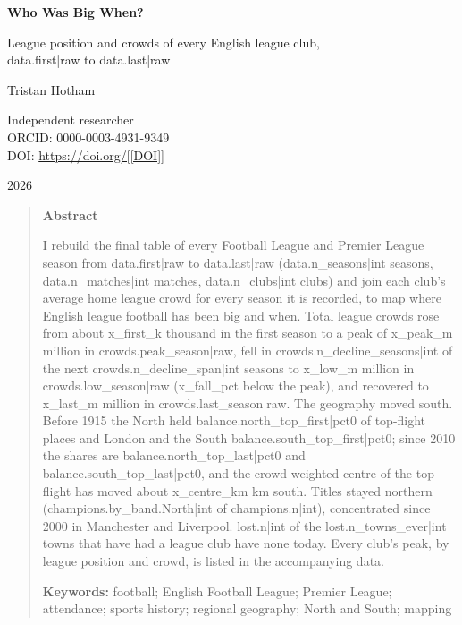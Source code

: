 \documentclass[11pt,a4paper]{article}
\begin{document}
\begin{center}
{\Large\bfseries Who Was Big When?\par}
\vspace{0.4em}
{\large League position and crowds of every English league club,\\{{data.first|raw}} to {{data.last|raw}}\par}
\vspace{1.2em}
{\large Tristan Hotham\par}
\vspace{0.3em}
{\small Independent researcher\\
ORCID: 0000-0003-4931-9349\\
DOI: \href{https://doi.org/[[DOI]]}{https://doi.org/[[DOI]]}\par}
\vspace{0.8em}
2026
\end{center}

\begin{quote}
\small
\begin{center}\textbf{Abstract}\end{center}
I rebuild the final table of every Football League and Premier League season from {{data.first|raw}} to {{data.last|raw}} ({{data.n_seasons|int}} seasons, {{data.n_matches|int}} matches, {{data.n_clubs|int}} clubs) and join each club's average home league crowd for every season it is recorded, to map where English league football has been big and when. Total league crowds rose from about {{x_first_k}} thousand in the first season to a peak of {{x_peak_m}} million in {{crowds.peak_season|raw}}, fell in {{crowds.n_decline_seasons|int}} of the next {{crowds.n_decline_span|int}} seasons to {{x_low_m}} million in {{crowds.low_season|raw}} ({{x_fall_pct}} below the peak), and recovered to {{x_last_m}} million in {{crowds.last_season|raw}}. The geography moved south. Before 1915 the North held {{balance.north_top_first|pct0}} of top-flight places and London and the South {{balance.south_top_first|pct0}}; since 2010 the shares are {{balance.north_top_last|pct0}} and {{balance.south_top_last|pct0}}, and the crowd-weighted centre of the top flight has moved about {{x_centre_km}} km south. Titles stayed northern ({{champions.by_band.North|int}} of {{champions.n|int}}), concentrated since 2000 in Manchester and Liverpool. {{lost.n|int}} of the {{lost.n_towns_ever|int}} towns that have had a league club have none today. Every club's peak, by league position and crowd, is listed in the accompanying data.

\textbf{Keywords:} football; English Football League; Premier League; attendance; sports history; regional geography; North and South; mapping
\end{quote}
\end{document}
